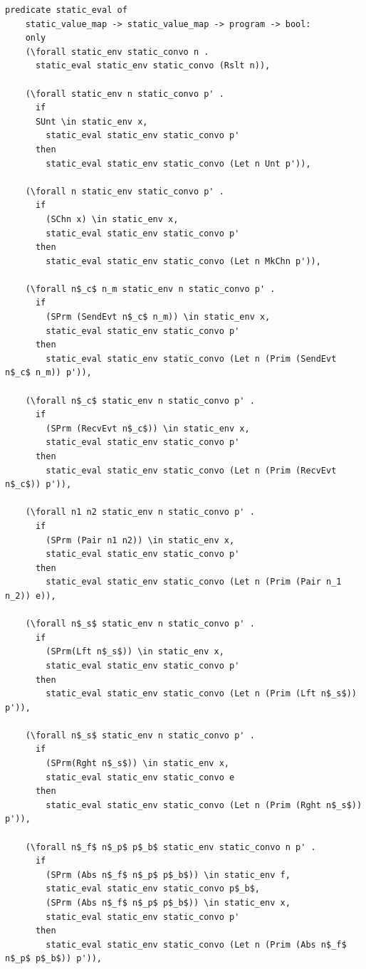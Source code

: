 \documentclass{article}
\begin{document}
\begin{lstlisting}[language=logic, mathescape]
  predicate static_eval of
    static_value_map -> static_value_map -> program -> bool:
    only
    (\forall static_env static_convo n .
      static_eval static_env static_convo (Rslt n)),

    (\forall static_env n static_convo p' .
      if 
      SUnt \in static_env x,
        static_eval static_env static_convo p'
      then
        static_eval static_env static_convo (Let n Unt p')),

    (\forall n static_env static_convo p' .
      if 
        (SChn x) \in static_env x,
        static_eval static_env static_convo p'
      then  
        static_eval static_env static_convo (Let n MkChn p')),

    (\forall n$_c$ n_m static_env n static_convo p' .
      if
        (SPrm (SendEvt n$_c$ n_m)) \in static_env x,
        static_eval static_env static_convo p' 
      then
        static_eval static_env static_convo (Let n (Prim (SendEvt n$_c$ n_m)) p')),

    (\forall n$_c$ static_env n static_convo p' . 
      if 
        (SPrm (RecvEvt n$_c$)) \in static_env x,
        static_eval static_env static_convo p'
      then
        static_eval static_env static_convo (Let n (Prim (RecvEvt n$_c$)) p')),

    (\forall n1 n2 static_env n static_convo p' .
      if
        (SPrm (Pair n1 n2)) \in static_env x,
        static_eval static_env static_convo p'
      then
        static_eval static_env static_convo (Let n (Prim (Pair n_1 n_2)) e)),

    (\forall n$_s$ static_env n static_convo p' .
      if
        (SPrm(Lft n$_s$)) \in static_env x,
        static_eval static_env static_convo p' 
      then
        static_eval static_env static_convo (Let n (Prim (Lft n$_s$)) p')),

    (\forall n$_s$ static_env n static_convo p' .
      if
        (SPrm(Rght n$_s$)) \in static_env x, 
        static_eval static_env static_convo e
      then
        static_eval static_env static_convo (Let n (Prim (Rght n$_s$)) p')),

    (\forall n$_f$ n$_p$ p$_b$ static_env static_convo n p' .
      if
        (SPrm (Abs n$_f$ n$_p$ p$_b$)) \in static_env f, 
        static_eval static_env static_convo p$_b$, 
        (SPrm (Abs n$_f$ n$_p$ p$_b$)) \in static_env x, 
        static_eval static_env static_convo p'
      then
        static_eval static_env static_convo (Let n (Prim (Abs n$_f$ n$_p$ p$_b$)) p')),


\end{lstlisting}
\end{document}
